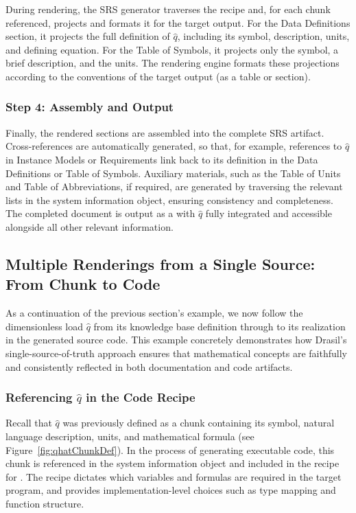 During rendering, the SRS generator traverses the recipe and, for each chunk 
referenced, projects and formats it for the target output. 
For the Data Definitions section, it projects the full definition of $\hat{q}$, 
including its symbol, description, units, and defining equation. For the Table 
of Symbols, it projects only the symbol, a brief description, and the units. 
The rendering engine formats these projections according to the conventions of 
the target output (as a  table or 
section). 

\subsubsection{Step 4: Assembly and Output}

Finally, the rendered sections are assembled into the complete SRS artifact. 
Cross-references are automatically generated, so that, for example, references 
to $\hat{q}$ in Instance Models or Requirements link back to its definition in 
the Data Definitions or Table of Symbols. Auxiliary materials, such as the 
Table of Units and Table of Abbreviations, if required, are generated by 
traversing the relevant lists in the system information object, ensuring 
consistency and completeness. The completed document is output as a 
 with $\hat{q}$ fully integrated and accessible 
alongside all other relevant information.

\subsection{Multiple Renderings from a Single Source: From Chunk to Code}

As a continuation of the previous section’s example, we now follow the 
dimensionless load $\hat{q}$ from its knowledge base definition through to its 
realization in the generated source code. This example concretely demonstrates 
how Drasil’s single-source-of-truth approach ensures that mathematical concepts 
are faithfully and consistently reflected in both documentation and code 
artifacts.

\subsubsection{Referencing $\hat{q}$ in the Code Recipe}

Recall that $\hat{q}$ was previously defined as a chunk containing its symbol, 
natural language description, units, and mathematical formula (see 
Figure~\ref{fig:qhatChunkDef}). In the process of generating executable code, 
this chunk is referenced in the system information object and included in the 
 recipe for \gb{}. The recipe dictates which variables and 
formulas are required in the target program, and provides implementation-level 
choices such as type mapping and function structure.

